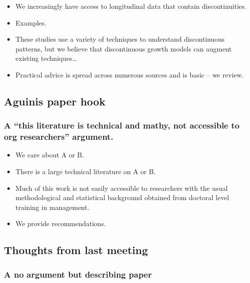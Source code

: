 \documentclass[english,,man]{apa6}
\providecommand{\tightlist}{%
  \setlength{\itemsep}{0pt}\setlength{\parskip}{0pt}}
\theoremstyle{definition}
\theoremstyle{definition}
\theoremstyle{definition}
\theoremstyle{remark}
\begin{document}
\begin{itemize}
\tightlist
\item
  We increasingly have access to longitudinal data that contain
  discontinuities.
\item
  Examples.
\item
  These studies use a variety of techniques to understand discontinuous
  patterns, but we believe that discontinuous growth models can augment
  existing techniques\ldots{}
\item
  Practical advice is spread across numerous sources and is basic -- we
  review.
\end{itemize}

\hypertarget{aguinis-paper-hook}{%
\subsection{Aguinis paper hook}\label{aguinis-paper-hook}}

\hypertarget{a-this-literature-is-technical-and-mathy-not-accessible-to-org-researchers-argument.}{%
\subsubsection{\texorpdfstring{A \enquote{this literature is technical
and mathy, not accessible to org researchers}
argument.}{A ``this literature is technical and mathy, not accessible to org researchers'' argument.}}\label{a-this-literature-is-technical-and-mathy-not-accessible-to-org-researchers-argument.}}

\begin{itemize}
\tightlist
\item
  We care about A or B.
\item
  There is a large technical literature on A or B.
\item
  Much of this work is not easily accessible to researchers with the
  usual methodological and statistical background obtained from doctoral
  level training in management.
\item
  We provide recommendations.
\end{itemize}

\hypertarget{thoughts-from-last-meeting}{%
\subsection{Thoughts from last
meeting}\label{thoughts-from-last-meeting}}

\hypertarget{a-no-argument-but-describing-paper}{%
\subsubsection{A no argument but describing
paper}\label{a-no-argument-but-describing-paper}}
\end{document}
